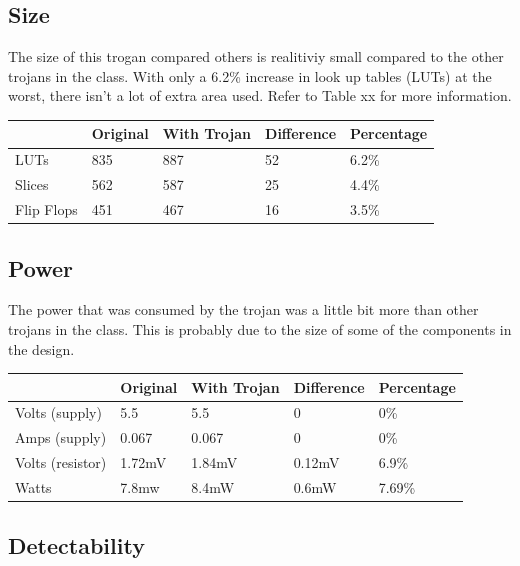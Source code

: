 \documentclass[letterpaper, 10 pt, conference]{ieeeconf}  %
\begin{document}
\subsection{Size}
 
The size of this trogan compared others is realitiviy small compared to the other trojans in the class. With only a 6.2\% increase in look up tables (LUTs) at the worst, there isn't a lot of extra area used. Refer to Table xx for more information.

 \begin{center}
    \begin{tabular}{| l | l | l | l | l |}
        \hline
        & Original & With Trojan & Difference & Percentage \\ \hline
        LUTs & 835 & 887 & 52 & 6.2\% \\ \hline
        Slices & 562 & 587 & 25 & 4.4\% \\ \hline
        Flip Flops & 451 & 467 & 16 & 3.5\% \\
        \hline
    \end{tabular}
\end{center}

\subsection{Power}

The power that was consumed by the trojan was a little bit more than other trojans in the class. This is probably due to the size of some of the components in the design.

 \begin{center}
    \begin{tabular}{| l | l | l | l | l |}
        \hline
        & Original & With Trojan & Difference & Percentage \\ \hline
        Volts (supply) & 5.5 & 5.5 & 0 & 0\% \\ \hline
        Amps (supply) & 0.067 & 0.067 & 0 & 0\% \\ \hline
        Volts (resistor) & 1.72mV & 1.84mV & 0.12mV & 6.9\% \\
        Watts & 7.8mw & 8.4mW & 0.6mW & 7.69\% \\
        \hline
    \end{tabular}
\end{center}

\subsection{Detectability}
\end{document}

